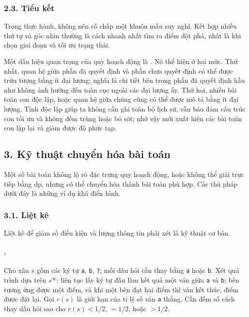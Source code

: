 \documentclass[11pt]{article}
\begin{document}
\subsubsection*{2.3. Tiểu kết}

Trong thực hành, không nên cố chấp một khuôn mẫu suy nghĩ. Kết hợp nhiều thứ
tự và góc nhìn thường là cách nhanh nhất tìm ra điểm đột phá, nhất là khi chọn
giai đoạn và tối ưu trạng thái.

Một dấu hiệu quan trọng của quy hoạch động là . Nó thể hiện
ở hai mức. Thứ nhất, quan hệ giữa phần đã quyết định và phần chưa quyết định có
thể được trừu tượng bằng ít đại lượng; nghĩa là chi tiết bên trong phần đã quyết
định hầu như không ảnh hưởng đến toàn cục ngoài các đại lượng ấy. Thứ hai,
nhiều bài toán con độc lập, hoặc quan hệ giữa chúng cũng có thể được mô tả bằng
ít đại lượng. Tính độc lập giúp ta không cần ghi toàn bộ lịch sử, vẫn bảo đảm
cấu trúc con tối ưu và không đếm trùng hoặc bỏ sót; nhờ vậy mới xuất hiện các
bài toán con lặp lại và giảm được độ phức tạp.

\subsection*{3. Kỹ thuật chuyển hóa bài toán}

Một số bài toán không lộ rõ đặc trưng quy hoạch động, hoặc không thể giải trực
tiếp bằng \(\mathrm{dp}\), nhưng có thể chuyển hóa thành bài toán phù hợp. Các
thủ pháp dưới đây là những ví dụ khá điển hình.

\subsubsection*{3.1. Liệt kê}

Liệt kê để giảm số điều kiện và lượng thông tin phải xét là kỹ thuật cơ bản.

\paragraph{.}
Cho xâu \(s\) gồm các ký tự \texttt{a}, \texttt{b}, \texttt{?}; mỗi dấu hỏi cần
thay bằng \texttt{a} hoặc \texttt{b}. Xét quá trình dựa trên \(s^\infty\): liên
tục lấy ký tự đầu làm kết quả một ván giữa \texttt{a} và \texttt{b}; bên tương
ứng được một điểm, và khi một bên đạt hai điểm thì ván kết thúc, điểm được đặt
lại. Gọi \(r(s)\) là giới hạn của tỉ lệ số ván \texttt{a} thắng. Cần đếm số
cách thay dấu hỏi sao cho \(r(s)<1/2\), \(=1/2\), hoặc \(>1/2\).
\end{document}
